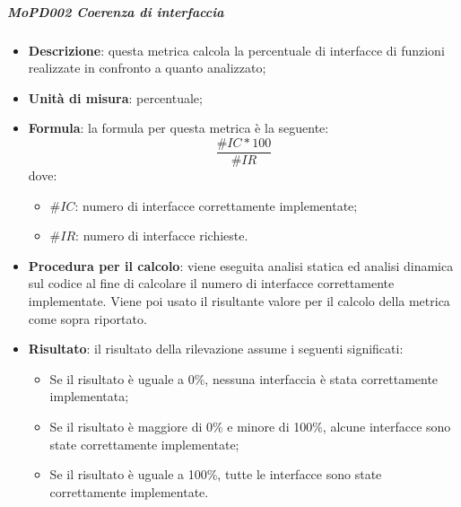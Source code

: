 \documentclass[../norme-di-progetto.tex]{subfiles}
\begin{document}
\subparagraph{MoPD002 Coerenza di interfaccia}
\begin{itemize}
  \item \textbf{Descrizione}: questa metrica calcola la percentuale di interfacce di funzioni realizzate in confronto a quanto analizzato;
  \item \textbf{Unità di misura}: percentuale;
  \item \textbf{Formula}: la formula per questa metrica è la seguente:
  \begin{displaymath}
    \frac{\#IC * 100}{\#IR}
  \end{displaymath}
  dove:
  \begin{itemize}
    \item $ \#IC $: numero di interfacce correttamente implementate;
    \item $ \#IR $: numero di interfacce richieste.
  \end{itemize}
  \item \textbf{Procedura per il calcolo}: viene eseguita analisi statica ed analisi dinamica sul codice al fine di calcolare il numero di interfacce correttamente implementate. Viene poi usato il risultante valore per il calcolo della metrica come sopra riportato.
  \item \textbf{Risultato}: il risultato della rilevazione assume i seguenti significati:
  \begin{itemize}
    \item Se il risultato è uguale a 0\%, nessuna interfaccia è stata correttamente implementata;
    \item Se il risultato è maggiore di 0\% e minore di 100\%, alcune interfacce sono state correttamente implementate;
    \item Se il risultato è uguale a 100\%, tutte le interfacce sono state correttamente implementate.
  \end{itemize}
\end{itemize}
\end{document}

